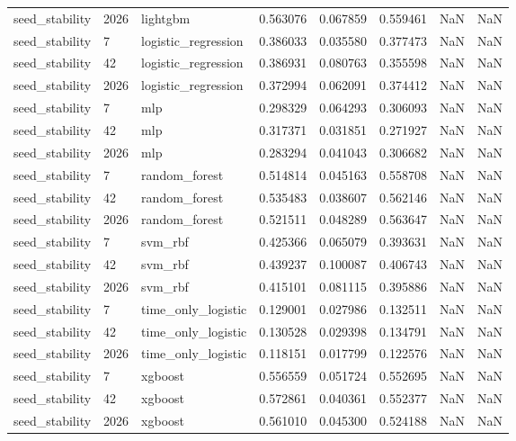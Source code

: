 \begin{tabular}{lllrrrrr}
seed\_stability & 2026 & lightgbm & 0.563076 & 0.067859 & 0.559461 & NaN & NaN \\
seed\_stability & 7 & logistic\_regression & 0.386033 & 0.035580 & 0.377473 & NaN & NaN \\
seed\_stability & 42 & logistic\_regression & 0.386931 & 0.080763 & 0.355598 & NaN & NaN \\
seed\_stability & 2026 & logistic\_regression & 0.372994 & 0.062091 & 0.374412 & NaN & NaN \\
seed\_stability & 7 & mlp & 0.298329 & 0.064293 & 0.306093 & NaN & NaN \\
seed\_stability & 42 & mlp & 0.317371 & 0.031851 & 0.271927 & NaN & NaN \\
seed\_stability & 2026 & mlp & 0.283294 & 0.041043 & 0.306682 & NaN & NaN \\
seed\_stability & 7 & random\_forest & 0.514814 & 0.045163 & 0.558708 & NaN & NaN \\
seed\_stability & 42 & random\_forest & 0.535483 & 0.038607 & 0.562146 & NaN & NaN \\
seed\_stability & 2026 & random\_forest & 0.521511 & 0.048289 & 0.563647 & NaN & NaN \\
seed\_stability & 7 & svm\_rbf & 0.425366 & 0.065079 & 0.393631 & NaN & NaN \\
seed\_stability & 42 & svm\_rbf & 0.439237 & 0.100087 & 0.406743 & NaN & NaN \\
seed\_stability & 2026 & svm\_rbf & 0.415101 & 0.081115 & 0.395886 & NaN & NaN \\
seed\_stability & 7 & time\_only\_logistic & 0.129001 & 0.027986 & 0.132511 & NaN & NaN \\
seed\_stability & 42 & time\_only\_logistic & 0.130528 & 0.029398 & 0.134791 & NaN & NaN \\
seed\_stability & 2026 & time\_only\_logistic & 0.118151 & 0.017799 & 0.122576 & NaN & NaN \\
seed\_stability & 7 & xgboost & 0.556559 & 0.051724 & 0.552695 & NaN & NaN \\
seed\_stability & 42 & xgboost & 0.572861 & 0.040361 & 0.552377 & NaN & NaN \\
seed\_stability & 2026 & xgboost & 0.561010 & 0.045300 & 0.524188 & NaN & NaN \\
\bottomrule
\end{tabular}
